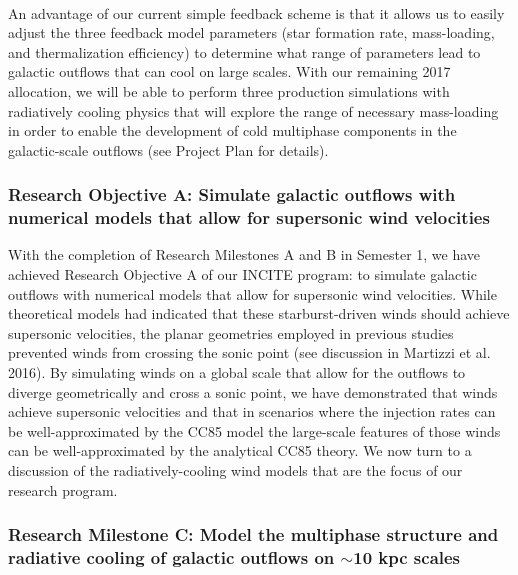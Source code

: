 \documentclass[11pt,letterpaper,english]{article}
\begin{document}
~\\
An advantage of our current simple feedback scheme is that it allows us to easily adjust the three feedback model parameters (star formation rate, mass-loading, and thermalization efficiency) to determine what range of parameters lead to galactic outflows that can cool on large scales. With our remaining 2017 allocation, we will be able to perform three production simulations with radiatively cooling physics that will explore the range of necessary mass-loading in order to enable the development of cold multiphase components in the
galactic-scale outflows (see Project Plan for details).

\subsubsection{Research Objective A: Simulate galactic outflows with numerical models that allow for supersonic wind velocities}

With the completion of Research Milestones A and B in Semester 1, we have achieved Research Objective A of our INCITE program: to simulate galactic outflows with numerical models that allow for supersonic wind velocities. While theoretical models had indicated that these starburst-driven winds should achieve supersonic velocities, the planar geometries employed in previous studies prevented winds from crossing the sonic point (see discussion in Martizzi et al. 2016). By simulating winds on a global scale that allow
for the outflows to diverge geometrically and cross a sonic point, we have demonstrated that winds achieve supersonic velocities and that in scenarios where the injection rates can be well-approximated by the CC85 model the large-scale features of those winds can be well-approximated by the analytical CC85 theory. We now turn to a discussion of the radiatively-cooling wind models that are the focus of our research program.

\subsubsection{Research Milestone C: Model the multiphase structure and radiative cooling of galactic outflows on $\sim$10 kpc scales}
\end{document}
